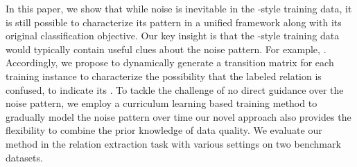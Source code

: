 
In this paper, we show that while noise is inevitable in the \DS-style training data, it is still possible to characterize its pattern  in a unified framework along with its original classification objective. Our key insight is that the \DS-style training  data would typically contain useful clues about the noise pattern. For example, 
.
Accordingly, we propose to dynamically generate a transition matrix for each training instance to characterize the possibility that the \DS labeled relation is confused, to indicate its .  To tackle the challenge of no direct guidance over the noise pattern, we employ a curriculum learning based training method to gradually model the noise pattern over time  our novel approach also provides the flexibility to combine the prior knowledge of data quality. 
We evaluate our method in the relation extraction task with various settings on two benchmark datasets. 


